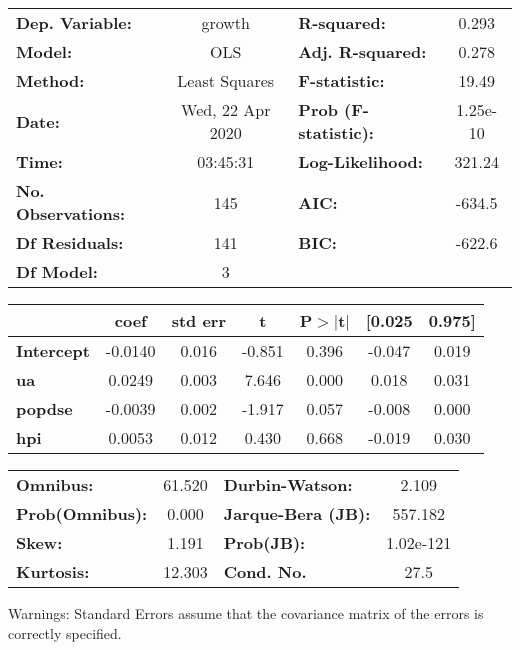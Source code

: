 \begin{center}
\begin{tabular}{lclc}
\toprule
\textbf{Dep. Variable:}    &      growth      & \textbf{  R-squared:         } &     0.293   \\
\textbf{Model:}            &       OLS        & \textbf{  Adj. R-squared:    } &     0.278   \\
\textbf{Method:}           &  Least Squares   & \textbf{  F-statistic:       } &     19.49   \\
\textbf{Date:}             & Wed, 22 Apr 2020 & \textbf{  Prob (F-statistic):} &  1.25e-10   \\
\textbf{Time:}             &     03:45:31     & \textbf{  Log-Likelihood:    } &    321.24   \\
\textbf{No. Observations:} &         145      & \textbf{  AIC:               } &    -634.5   \\
\textbf{Df Residuals:}     &         141      & \textbf{  BIC:               } &    -622.6   \\
\textbf{Df Model:}         &           3      & \textbf{                     } &             \\
\bottomrule
\end{tabular}
\begin{tabular}{lcccccc}
                   & \textbf{coef} & \textbf{std err} & \textbf{t} & \textbf{P$> |$t$|$} & \textbf{[0.025} & \textbf{0.975]}  \\
\midrule
\textbf{Intercept} &      -0.0140  &        0.016     &    -0.851  &         0.396        &       -0.047    &        0.019     \\
\textbf{ua}        &       0.0249  &        0.003     &     7.646  &         0.000        &        0.018    &        0.031     \\
\textbf{popdse}    &      -0.0039  &        0.002     &    -1.917  &         0.057        &       -0.008    &        0.000     \\
\textbf{hpi}       &       0.0053  &        0.012     &     0.430  &         0.668        &       -0.019    &        0.030     \\
\bottomrule
\end{tabular}
\begin{tabular}{lclc}
\textbf{Omnibus:}       & 61.520 & \textbf{  Durbin-Watson:     } &     2.109  \\
\textbf{Prob(Omnibus):} &  0.000 & \textbf{  Jarque-Bera (JB):  } &   557.182  \\
\textbf{Skew:}          &  1.191 & \textbf{  Prob(JB):          } & 1.02e-121  \\
\textbf{Kurtosis:}      & 12.303 & \textbf{  Cond. No.          } &      27.5  \\
\bottomrule
\end{tabular}
\end{center}

Warnings: \newline
 [1] Standard Errors assume that the covariance matrix of the errors is correctly specified.